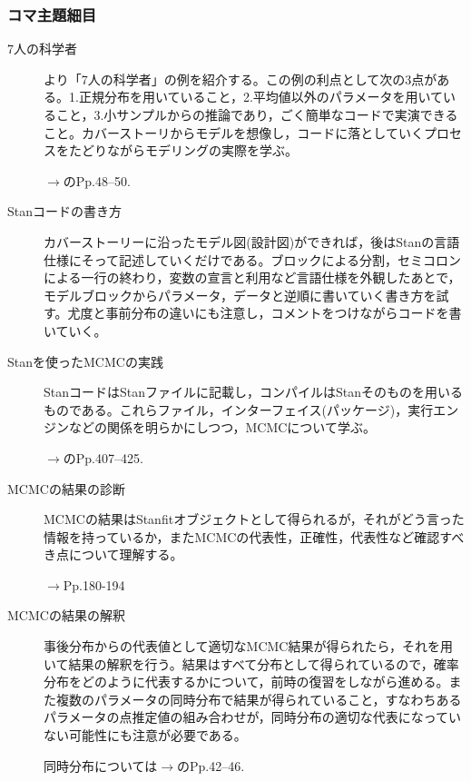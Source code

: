 \subsubsection{コマ主題細目}
\begin{description}
	\item[7人の科学者] \citet{Lee201709}より「7人の科学者」の例を紹介する。この例の利点として次の3点がある。1.正規分布を用いていること，2.平均値以外のパラメータを用いていること，3.小サンプルからの推論であり，ごく簡単なコードで実演できること。カバーストーリからモデルを想像し，コードに落としていくプロセスをたどりながらモデリングの実際を学ぶ。
	      \begin{flushright}
		      $\to$\citet{Lee201709}のPp.48--50.
	      \end{flushright}
	\item[Stanコードの書き方] カバーストーリーに沿ったモデル図(設計図)ができれば，後はStanの言語仕様にそって記述していくだけである。ブロックによる分割，セミコロンによる一行の終わり，変数の宣言と利用など言語仕様を外観したあとで，モデルブロックからパラメータ，データと逆順に書いていく書き方を試す。尤度と事前分布の違いにも注意し，コメントをつけながらコードを書いていく。

	\item[Stanを使ったMCMCの実践] StanコードはStanファイルに記載し，コンパイルはStanそのものを用いるものである。これらファイル，インターフェイス(パッケージ)，実行エンジンなどの関係を明らかにしつつ，MCMCについて学ぶ。

	      \begin{flushright}
		      $\to$\citet{Maeda2017}のPp.407--425.
	      \end{flushright}


	\item[MCMCの結果の診断] MCMCの結果はStanfitオブジェクトとして得られるが，それがどう言った情報を持っているか，またMCMCの代表性，正確性，代表性など確認すべき点について理解する。

	      \begin{flushright}
		      $\to$\citet{Maeda2017}Pp.180-194
	      \end{flushright}

	\item[MCMCの結果の解釈] 事後分布からの代表値として適切なMCMC結果が得られたら，それを用いて結果の解釈を行う。結果はすべて分布として得られているので，確率分布をどのように代表するかについて，前時の復習をしながら進める。また複数のパラメータの同時分布で結果が得られていること，すなわちあるパラメータの点推定値の組み合わせが，同時分布の適切な代表になっていない可能性にも注意が必要である。

	      \begin{flushright}
		      同時分布については$\to$\citet{Lee201709}のPp.42--46.
	      \end{flushright}
\end{description}
